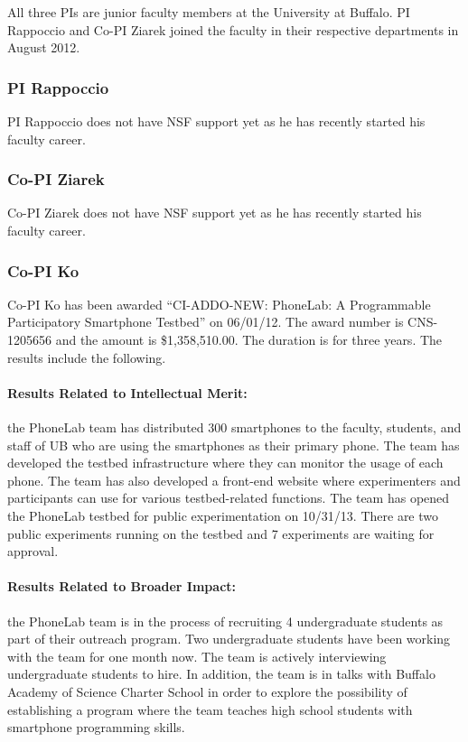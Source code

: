\documentclass[times,11pt]{article}
\begin{document}
All three PIs are junior faculty members at the University at Buffalo. 
PI Rappoccio and Co-PI Ziarek joined the faculty in their
respective departments in August 2012.

\subsubsection{PI Rappoccio}
PI Rappoccio does not have NSF support yet as he has recently started his
faculty career.

\subsubsection{Co-PI Ziarek}
Co-PI Ziarek does not have NSF support yet as he has recently started his
faculty career.

\subsubsection{Co-PI Ko}
Co-PI Ko has been awarded ``CI-ADDO-NEW: PhoneLab: A Programmable Participatory
Smartphone Testbed'' on 06/01/12. The award number is CNS-1205656 and the amount
is \$1,358,510.00. The duration is for three years. The results include the
following.

\paragraph{Results Related to Intellectual Merit:} the PhoneLab team has
distributed 300 smartphones to the faculty, students, and staff of UB who are
using the smartphones as their primary phone. The team has developed the testbed
infrastructure where they can monitor the usage of each phone. The team has also
developed a front-end website where experimenters and participants can use for
various testbed-related functions. The team has opened the PhoneLab testbed for
public experimentation on 10/31/13. There are two public experiments running on
the testbed and 7 experiments are waiting for approval.

\paragraph{Results Related to Broader Impact:} the PhoneLab team is in the
process of recruiting 4 undergraduate students as part of their outreach
program. Two undergraduate students have been working with the team for one
month now. The team is actively interviewing undergraduate students to hire. In
addition, the team is in talks with Buffalo Academy of Science Charter School in
order to explore the possibility of establishing a program where the team
teaches high school students with smartphone programming skills.
\end{document}
